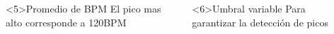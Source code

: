 \documentclass[slidestop,compress,mathserif,xcolor=svgnames,table,xcolor=dvipsnames]{beamer}
\begin{document}
\begin{frame}
\begin{columns}
\begin{scriptsize}


\end{scriptsize}

\vspace*{-205pt}
\begin{block}<5>{Promedio de BPM}
El pico mas alto corresponde a 120BPM
\end{block}

\vspace*{-44pt}
\begin{block}<6>{Umbral variable}
Para garantizar la detección de picos
\end{block}

\end{columns}

\end{frame}
\end{document}
